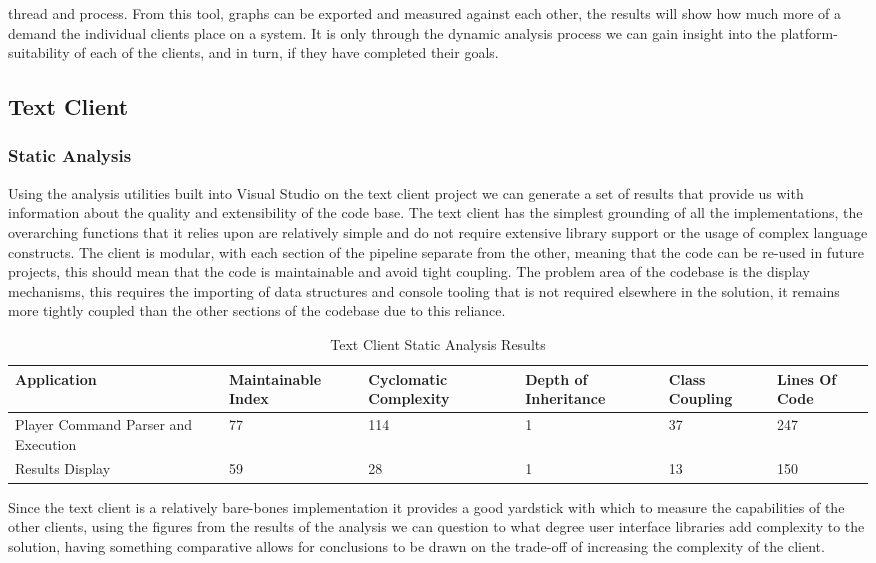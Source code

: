 \documentclass{article}
\begin{document}
thread and process. From this tool, graphs can be exported and measured against each other, the results will show how much more of a demand the individual clients place on a system. It is only through the dynamic analysis process we can gain insight into the platform-suitability of each of the clients, and in turn, if they have completed their goals.
\subsection{Text Client}
\subsubsection{Static Analysis}
Using the analysis utilities built into Visual Studio on the text client project we can generate a set of results that provide us with information about the quality and extensibility of the code base. The text client has the simplest grounding of all the implementations, the overarching functions that it relies upon are relatively simple and do not require extensive library support or the usage of complex language constructs. The client is modular, with each section of the pipeline separate from the other, meaning that the code can be re-used in future projects, this should mean that the code is maintainable and avoid tight coupling. The problem area of the codebase is the display mechanisms, this requires the importing of data structures and console tooling that is not required elsewhere in the solution, it remains more tightly coupled than the other sections of the codebase due to this reliance.
\begin{table}[H]
	\centering
	\caption{Text Client Static Analysis Results}
	\label{my-label}
	\begin{tabularx}{\textwidth}{|X|X|X|X|X|X|}
		\hline
		\textbf{Application} & \textbf{Maintainable Index} & \textbf{Cyclomatic Complexity} & \textbf{Depth of Inheritance} & \textbf{Class Coupling} & \textbf{Lines Of Code} \\ \hline
		Player Command Parser and Execution & 77 &      114     &     1      &    37       &     247      \\ \hline
		Results Display & 59 &       28    &       1    &     13      &       150    \\ \hline
	\end{tabularx}
\end{table}
Since the text client is a relatively bare-bones implementation it provides a good yardstick with which to measure the capabilities of the other clients, using the figures from the results of the analysis we can question to what degree user interface libraries add complexity to the solution, having something comparative allows for conclusions to be drawn on the trade-off of increasing the complexity of the client.
\end{document}

